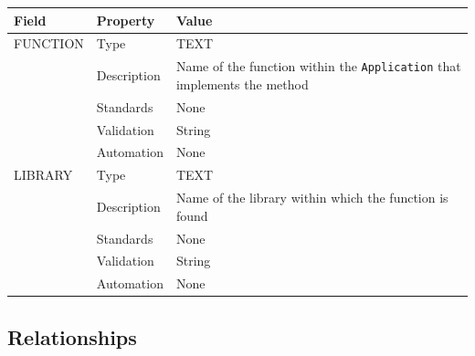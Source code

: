 \documentclass[
]{article}
\newcounter{none}
\begin{document}
{\def\LTcaptype{none} 
\begin{longtable}[]{@{}
  >{\raggedright\arraybackslash}p{}
  >{\raggedright\arraybackslash}p{}
  >{\raggedright\arraybackslash}p{}@{}}
\toprule\noalign{}
\begin{minipage}[b]{\linewidth}\raggedright
Field
\end{minipage} & \begin{minipage}[b]{\linewidth}\raggedright
Property
\end{minipage} & \begin{minipage}[b]{\linewidth}\raggedright
Value
\end{minipage} \\
\midrule\noalign{}
\endhead
\bottomrule\noalign{}
\endlastfoot
FUNCTION & Type & TEXT \\
& Description & Name of the function within the \texttt{Application}
that implements the method \\
& Standards & None \\
& Validation & String \\
& Automation & None \\
LIBRARY & Type & TEXT \\
& Description & Name of the library within which the function is
found \\
& Standards & None \\
& Validation & String \\
& Automation & None \\
\end{longtable}
}

\subsection{Relationships}\label{relationships-12}
\end{document}
